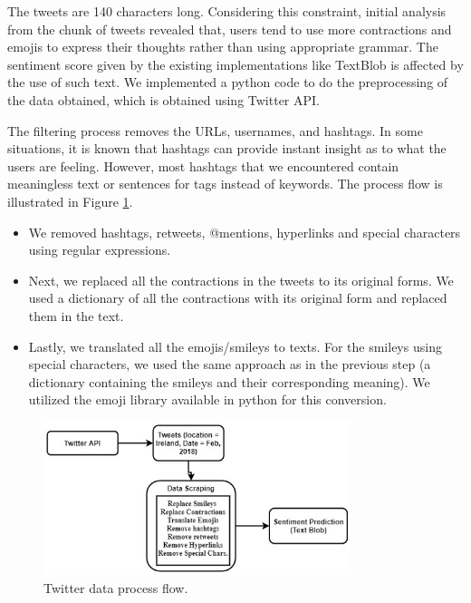 \documentclass[a4paper,10pt]{article}
\begin{document}
The tweets are 140 characters long. Considering this constraint, initial analysis from the chunk of tweets revealed that, users tend to use more contractions and emojis to express their thoughts rather than using appropriate grammar. The sentiment score given by the existing implementations like TextBlob is affected by the use of such text. We implemented a python code to do the preprocessing of the data obtained, which is obtained using Twitter API. 

The filtering process removes the URLs, usernames, and hashtags. In some situations, it is known that hashtags can provide instant insight as to what the users are feeling. However, most hashtags that we encountered contain meaningless text or sentences for tags instead of keywords. The process flow is illustrated in Figure \ref{fig:twitter_process_flow}.

\begin{itemize}
	\item{
		We removed hashtags, retweets, @mentions, hyperlinks and special characters using regular expressions.
	}
	\item{
		Next, we replaced all the contractions in the tweets to its original forms. We used a dictionary of all the contractions with its original form and replaced them in the text.
	}
	\item{
		Lastly, we translated all the emojis/smileys to texts. For the smileys using special characters, we used the same approach as in the previous step (a dictionary containing the smileys and their corresponding meaning). We utilized the emoji library available in python for this conversion.
	}
\end{itemize}

\begin{figure}
    \includegraphics[width=0.8\textwidth]{twitter_process_flow.jpeg}
    \caption{Twitter data process flow.}
    \label{fig:twitter_process_flow}
\end{figure}
\end{document}

